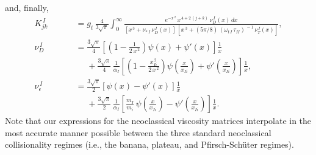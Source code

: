 \documentclass[notitlepage,12pt]{article}
\begin{document}
and, finally, 
\begin{align}
 K_{jk}^{\,I} &= g_t\,\frac{4}{3\sqrt{\pi}}\int_0^\infty
\frac{e^{-x^{\,2}}\,x^{\,4+2\,(j+k)}\,\nu_D^{\,I}(x)\,dx}{[x^{\,3}+\nu_{\ast\,I}\,\nu_D^{\,I}(x)]\,[x^{\,3}+(5\pi/8)\,(\omega_{t\,I}\,\tau_{II})^{\,-1}\,\nu_T^{\,I}(x)]},\\[0.5ex]
 \nu_D^{\,I}&= \frac{3\sqrt{\pi}}{4}\left[\left(1-\frac{1}{2\,x^{\,2}}\right)\psi(x)+\psi'(x)\right]\frac{1}{x}\nonumber\\[0.5ex]\phantom{===}
&\phantom{=}+\frac{3\sqrt{\pi}}{4}\,\frac{1}{\alpha_I}\left[\left(1-\frac{x_{Ii}^{\,2}}{2\,x^{\,2}}\right)\psi\!\left(\frac{x}{x_{Ii}}\right)
+\psi'\!\left(\frac{x}{x_{Ii}}\right)\right]\frac{1}{x},\\[0.5ex]
 \nu_\epsilon^{\,I}&= \frac{3\sqrt{\pi}}{2}\left[\psi(x)-\psi'(x)\right]\frac{1}{x}\nonumber\\[0.5ex]\phantom{===}
&\phantom{=}+\frac{3\sqrt{\pi}}{2}\,\frac{1}{\alpha_I}\left[\frac{m_I}{m_i}\,\psi\!\left(\frac{x}{x_{Ii}}\right)
-\psi'\!\left(\frac{x}{x_{Ii}}\right)\right]\frac{1}{x}.
\end{align}
Note that our expressions for the neoclassical viscosity
matrices interpolate in the most accurate manner possible
between the three standard neoclassical collisionality
regimes (i.e., the banana, plateau, and Pfirsch-Sch\"{u}ter
regimes).
\end{document}
